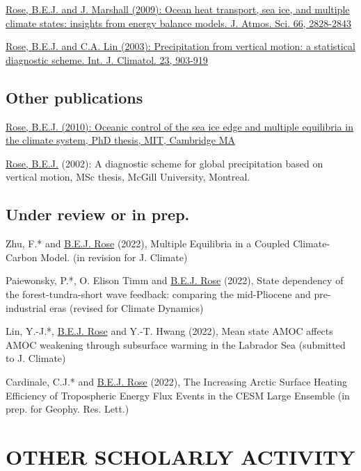 \documentclass[11pt, letterpaper]{article} %
\newcommand{\years}[1]{\marginnote{\scriptsize #1}} %
\newcommand{\publink}{http://www.atmos.albany.edu/facstaff/brose/resources/Publications/}
\begin{document}
\years{2009}  
\href{\publink Rose_Marshall_JAS2009.pdf}{\underline{Rose, B.E.J.} and J. Marshall (2009): Ocean heat transport, sea ice, and multiple climate states: insights from energy balance models. J. Atmos. Sci. 66, 2828-2843}
\vspace{0.2 cm}
  
\years{2003}  
\href{\publink Rose_Lin_2003.pdf}{\underline{Rose, B.E.J.} and C.A. Lin (2003): Precipitation from vertical motion: a statistical diagnostic scheme. Int. J. Climatol. 23, 903-919}


\subsection*{Other publications}
\years{2010}  
\href{\publink Rose_PhD_2010.pdf}{\underline{Rose, B.E.J.} (2010): Oceanic control of the sea ice edge and multiple equilibria in the climate system, PhD thesis, MIT, Cambridge MA}
\vspace{0.2 cm}

\years{2002}  
\underline{Rose, B.E.J.} (2002): A diagnostic scheme for global precipitation based on vertical motion, MSc thesis, McGill University, Montreal.


\subsection*{Under review or in prep.}\label{work-in-progress}

Zhu, F.* and \underline{B.E.J. Rose} (2022), Multiple Equilibria in a Coupled Climate-Carbon Model. (in revision for J. Climate)
\vspace{0.2 cm} 

Paiewonsky, P.*, O. Elison Timm and \underline{B.E.J. Rose} (2022), State dependency of the forest-tundra-short wave feedback: comparing the mid-Pliocene and pre-industrial eras (revised for Climate Dynamics)
\vspace{0.2 cm}

Lin, Y.-J.*, \underline{B.E.J. Rose} and Y.-T. Hwang (2022), Mean state AMOC affects AMOC weakening through subsurface warming in the Labrador Sea (submitted to J. Climate)
\vspace{0.2 cm}

Cardinale, C.J.* and \underline{B.E.J. Rose} (2022), The Increasing Arctic Surface Heating Efficiency of Tropospheric Energy Flux Events in the CESM Large Ensemble (in prep. for Geophy. Res. Lett.)


\section*{OTHER SCHOLARLY ACTIVITY}\label{other-scholarly-activity}
\end{document}
